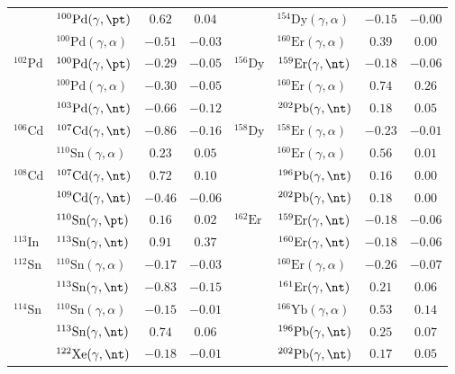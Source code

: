 {\begin{longtable}{llcc llcc}
$ $ & $^{100}\mathrm{Pd}(\gamma,\pt)$ & $0.62$ & $0.04$ & $ $ & $^{154}\mathrm{Dy}(\gamma,\alpha)$ & $-0.15$ & $-0.00$ \\ 
$ $ & $^{100}\mathrm{Pd}(\gamma,\alpha)$ & $-0.51$ & $-0.03$ & $ $ & $^{160}\mathrm{Er}(\gamma,\alpha)$ & $0.39$ & $0.00$ \\ 
$^{102}\mathrm{Pd}$ & $^{100}\mathrm{Pd}(\gamma,\pt)$ & $-0.29$ & $-0.05$ & $^{156}\mathrm{Dy}$ & $^{159}\mathrm{Er}(\gamma,\nt)$ & $-0.18$ & $-0.06$ \\ 
$ $ & $^{100}\mathrm{Pd}(\gamma,\alpha)$ & $-0.30$ & $-0.05$ & $ $ & $^{160}\mathrm{Er}(\gamma,\alpha)$ & $0.74$ & $0.26$ \\ 
$ $ & $^{103}\mathrm{Pd}(\gamma,\nt)$ & $-0.66$ & $-0.12$ & $ $ & $^{202}\mathrm{Pb}(\gamma,\nt)$ & $0.18$ & $0.05$ \\ 
$^{106}\mathrm{Cd}$ & $^{107}\mathrm{Cd}(\gamma,\nt)$ & $-0.86$ & $-0.16$ & $^{158}\mathrm{Dy}$ & $^{158}\mathrm{Er}(\gamma,\alpha)$ & $-0.23$ & $-0.01$ \\ 
$ $ & $^{110}\mathrm{Sn}(\gamma,\alpha)$ & $0.23$ & $0.05$ & $ $ & $^{160}\mathrm{Er}(\gamma,\alpha)$ & $0.56$ & $0.01$ \\ 
$^{108}\mathrm{Cd}$ & $^{107}\mathrm{Cd}(\gamma,\nt)$ & $0.72$ & $0.10$ & $ $ & $^{196}\mathrm{Pb}(\gamma,\nt)$ & $0.16$ & $0.00$ \\ 
$ $ & $^{109}\mathrm{Cd}(\gamma,\nt)$ & $-0.46$ & $-0.06$ & $ $ & $^{202}\mathrm{Pb}(\gamma,\nt)$ & $0.18$ & $0.00$ \\ 
$ $ & $^{110}\mathrm{Sn}(\gamma,\pt)$ & $0.16$ & $0.02$ & $^{162}\mathrm{Er}$ & $^{159}\mathrm{Er}(\gamma,\nt)$ & $-0.18$ & $-0.06$ \\ 
$^{113}\mathrm{In}$ & $^{113}\mathrm{Sn}(\gamma,\nt)$ & $0.91$ & $0.37$ & $ $ & $^{160}\mathrm{Er}(\gamma,\nt)$ & $-0.18$ & $-0.06$ \\ 
$^{112}\mathrm{Sn}$ & $^{110}\mathrm{Sn}(\gamma,\alpha)$ & $-0.17$ & $-0.03$ & $ $ & $^{160}\mathrm{Er}(\gamma,\alpha)$ & $-0.26$ & $-0.07$ \\ 
$ $ & $^{113}\mathrm{Sn}(\gamma,\nt)$ & $-0.83$ & $-0.15$ & $ $ & $^{161}\mathrm{Er}(\gamma,\nt)$ & $0.21$ & $0.06$ \\ 
$^{114}\mathrm{Sn}$ & $^{110}\mathrm{Sn}(\gamma,\alpha)$ & $-0.15$ & $-0.01$ & $ $ & $^{166}\mathrm{Yb}(\gamma,\alpha)$ & $0.53$ & $0.14$ \\ 
$ $ & $^{113}\mathrm{Sn}(\gamma,\nt)$ & $0.74$ & $0.06$ & $ $ & $^{196}\mathrm{Pb}(\gamma,\nt)$ & $0.25$ & $0.07$ \\ 
$ $ & $^{122}\mathrm{Xe}(\gamma,\nt)$ & $-0.18$ & $-0.01$ & $ $ & $^{202}\mathrm{Pb}(\gamma,\nt)$ & $0.17$ & $0.05$ \\ 

\end{longtable}}
